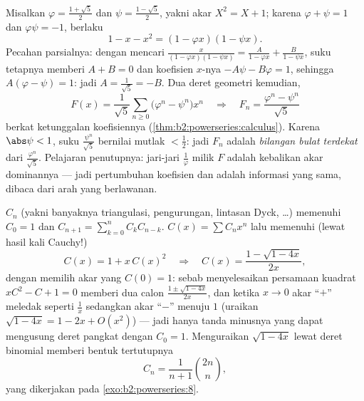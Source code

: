 \begin{example}\label{ex:b2:powerseries:binet}
Misalkan $\varphi = \frac{1+\sqrt5}{2}$ dan $\psi =
\frac{1-\sqrt5}{2}$, yakni akar $X^2 = X + 1$; karena $\varphi
+ \psi = 1$ dan $\varphi\psi = -1$, berlaku
\[
1 - x - x^2 = (1 - \varphi x)(1 - \psi x) .
\]
Pecahan parsialnya: dengan mencari $\frac{x}{(1-\varphi x)(1-\psi x)} =
\frac{A}{1 - \varphi x} + \frac{B}{1 - \psi x}$, suku tetapnya
memberi $A + B = 0$ dan koefisien $x$-nya $-A\psi - B\varphi = 1$,
sehingga $A(\varphi - \psi) = 1$: jadi $A = \frac{1}{\sqrt5} = -B$.
Dua deret geometri kemudian,
\[
F(x) = \frac{1}{\sqrt5}\sum_{n\geq0}
\bigl(\varphi^n - \psi^n\bigr)x^n
\quad\Longrightarrow\quad
F_n = \frac{\varphi^n - \psi^n}{\sqrt5}
\]
berkat ketunggalan koefisiennya
(\cref{thm:b2:powerseries:calculus}). Karena $\abs\psi < 1$, suku
$\frac{\psi^n}{\sqrt5}$ bernilai mutlak $< \frac12$: jadi
$F_n$ adalah \emph{bilangan bulat terdekat} dari
$\frac{\varphi^n}{\sqrt5}$. Pelajaran penutupnya: jari-jari
$\frac1\varphi$ milik $F$ adalah kebalikan akar dominannya
--- jadi pertumbuhan koefisien dan  adalah
informasi yang sama, dibaca dari arah yang berlawanan.
\end{example}

\begin{example}\label{ex:b2:powerseries:catalan}
 $C_n$ (yakni banyaknya triangulasi, pengurungan,
lintasan Dyck, \dots) memenuhi $C_0 = 1$ dan $C_{n+1} = \sum_{k=0}^n
C_kC_{n-k}$.  $C(x) = \sum C_nx^n$ lalu
memenuhi (lewat hasil kali Cauchy!)
\[
C(x) = 1 + x\,C(x)^2
\quad\Longrightarrow\quad
C(x) = \frac{1 - \sqrt{1 - 4x}}{2x} ,
\]
dengan memilih akar yang $C(0) = 1$: sebab menyelesaikan persamaan
kuadrat $xC^2 - C + 1 = 0$ memberi dua calon $\frac{1 \pm
\sqrt{1-4x}}{2x}$, dan ketika $x \to 0$ akar ``$+$'' meledak
seperti $\frac1x$ sedangkan akar ``$-$'' menuju $1$ (uraikan
$\sqrt{1-4x} = 1 - 2x + O(x^2)$) --- jadi hanya tanda minusnya yang
dapat mengusung deret pangkat dengan $C_0 = 1$. Menguraikan $\sqrt{1 -
4x}$ lewat deret binomial memberi bentuk tertutupnya
\[
C_n = \frac{1}{n+1}\binom{2n}{n} ,
\]
yang dikerjakan pada \cref{exo:b2:powerseries:8}.
\end{example}

